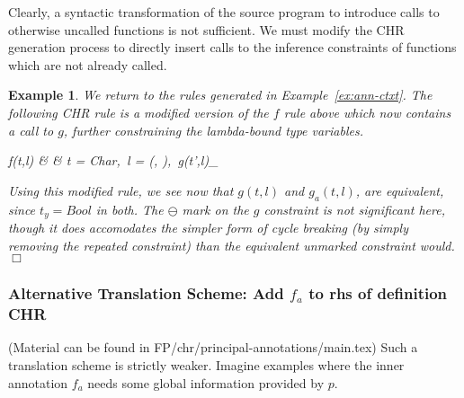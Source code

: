 \documentclass{article}
\newcommand{\simparrow}[0]{\Longleftrightarrow}
\newtheorem{ex}{Example}
\newenvironment{example}{
        \begin{ex}\rm}%
        {\hfill$\Box$\end{ex}}
\begin{document}
Clearly, a syntactic transformation of the source program to introduce calls
to otherwise uncalled functions is not sufficient.
We must modify the CHR generation process to directly insert calls to the
inference constraints of functions which are not already called.

\begin{example}
We return to the rules generated in Example~\ref{ex:ann-ctxt}.
The following CHR rule is a modified version of the $f$ rule above which now
contains a call to $g$, further constraining the lambda-bound type variables.

f(t,l) & \simparrow & t = Char,~l = (\llist{}, ),~g(t',l)_{\ominus}
\eda

Using this modified rule, we see now that $g(t,l)$ and $g_a(t,l)$, are
equivalent, since $t_y = Bool$ in both.
The $\ominus$ mark on the $g$ constraint is not significant here, though it
does accomodates the simpler form of cycle breaking (by simply removing the
repeated constraint) than the equivalent unmarked constraint would.
\end{example}

\subsubsection{Alternative Translation Scheme: Add $f_a$ to rhs of definition CHR}


(Material can be found in FP/chr/principal-annotations/main.tex)
Such a translation scheme is strictly weaker.
Imagine examples
where the inner annotation $f_a$ needs some global information provided by $p$.
\end{document}
